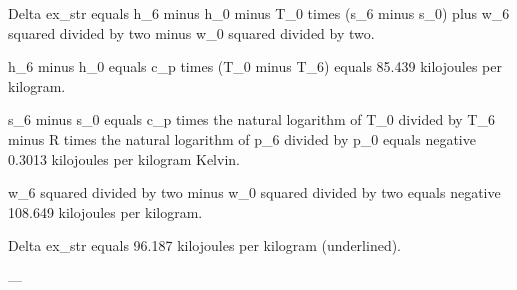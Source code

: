 Delta ex_str equals h_6 minus h_0 minus T_0 times (s_6 minus s_0) plus w_6 squared divided by two minus w_0 squared divided by two.  

h_6 minus h_0 equals c_p times (T_0 minus T_6) equals 85.439 kilojoules per kilogram.  

s_6 minus s_0 equals c_p times the natural logarithm of T_0 divided by T_6 minus R times the natural logarithm of p_6 divided by p_0 equals negative 0.3013 kilojoules per kilogram Kelvin.  

w_6 squared divided by two minus w_0 squared divided by two equals negative 108.649 kilojoules per kilogram.  

Delta ex_str equals 96.187 kilojoules per kilogram (underlined).  

---